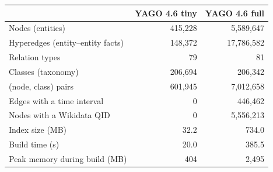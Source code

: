 \begin{tabular}{lrr}
\toprule
 & YAGO 4.6 tiny & YAGO 4.6 full \\
\midrule
Nodes (entities) & 415{,}228 & 5{,}589{,}647 \\
Hyperedges (entity--entity facts) & 148{,}372 & 17{,}786{,}582 \\
Relation types & 79 & 81 \\
Classes (taxonomy) & 206{,}694 & 206{,}342 \\
(node, class) pairs & 601{,}945 & 7{,}012{,}658 \\
Edges with a time interval & 0 & 446{,}462 \\
Nodes with a Wikidata QID & 0 & 5{,}556{,}213 \\
Index size (MB) & 32.2 & 734.0 \\
Build time (s) & 20.0 & 385.5 \\
Peak memory during build (MB) & 404 & 2{,}495 \\
\bottomrule
\end{tabular}

